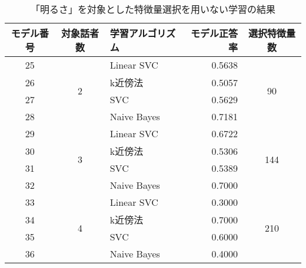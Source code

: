 \begin{table}[ptb]
    \caption{「明るさ」を対象とした特徴量選択を用いない学習の結果}
    \centering
    \begin{tabular}{|c|c|l|r|c|}
        \hline
        モデル番号 & 対象話者数 & 学習アルゴリズム & モデル正答率 & 選択特徴量数 \\\hline\hline
        25 & \multirow{4}{*}{2} & Linear SVC & 0.5638 & \multirow{4}{*}{90} \\ \cline{1-1}\cline{3-4}
        26 & & k近傍法 & 0.5057 & \\ \cline{1-1}\cline{3-4}
        27 & & SVC & 0.5629 & \\ \cline{1-1}\cline{3-4}
        28 & & Naive Bayes & 0.7181 & \\ \hline
        29 & \multirow{4}{*}{3} & Linear SVC & 0.6722 & \multirow{4}{*}{144} \\ \cline{1-1}\cline{3-4}
        30 & & k近傍法 & 0.5306 & \\ \cline{1-1}\cline{3-4}
        31 & & SVC & 0.5389 & \\ \cline{1-1}\cline{3-4}
        32 & & Naive Bayes & 0.7000 & \\ \hline
        33 & \multirow{4}{*}{4} & Linear SVC & 0.3000 & \multirow{4}{*}{210} \\ \cline{1-1}\cline{3-4}
        34 & & k近傍法 & 0.7000 & \\ \cline{1-1}\cline{3-4}
        35 & & SVC & 0.6000 & \\ \cline{1-1}\cline{3-4}
        36 & & Naive Bayes & 0.4000 & \\ \hline
    \end{tabular}
    \label{tab:cheerfulness_learning_result_without_FS}
\end{table}

